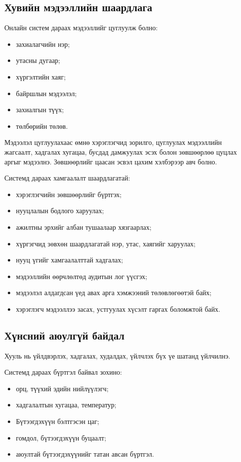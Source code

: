 \subsection{Хувийн мэдээллийн шаардлага}
Онлайн систем дараах мэдээллийг цуглуулж болно:
\begin{itemize}
    \item захиалагчийн нэр;
    \item утасны дугаар;
    \item хүргэлтийн хаяг;
    \item байршлын мэдээлэл;
    \item захиалгын түүх;
    \item төлбөрийн төлөв.
\end{itemize}

Мэдээлэл цуглуулахаас өмнө хэрэглэгчид зорилго, цуглуулах мэдээллийн жагсаалт, хадгалах хугацаа, бусдад дамжуулах эсэх болон зөвшөөрлөө цуцлах аргыг мэдээлнэ. Зөвшөөрлийг цаасан эсвэл цахим хэлбэрээр авч болно.

Системд дараах хамгаалалт шаардлагатай:
\begin{itemize}
    \item хэрэглэгчийн зөвшөөрлийг бүртгэх;
    \item нууцлалын бодлого харуулах;
    \item ажилтны эрхийг албан тушаалаар хязгаарлах;
    \item хүргэгчид зөвхөн шаардлагатай нэр, утас, хаягийг харуулах;
    \item нууц үгийг хамгаалалттай хадгалах;
    \item мэдээллийн өөрчлөлтөд аудитын лог үүсгэх;
    \item мэдээлэл алдагдсан үед авах арга хэмжээний төлөвлөгөөтэй байх;
    \item хэрэглэгч мэдээллээ засах, устгуулах хүсэлт гаргах боломжтой байх.
\end{itemize}

\subsection{Хүнсний аюулгүй байдал}

Хууль нь үйлдвэрлэх, хадгалах, худалдах, үйлчлэх бүх үе шатанд үйлчилнэ.

Системд дараах бүртгэл байвал зохино:
\begin{itemize}
    \item орц, түүхий эдийн нийлүүлэгч;
    \item хадгалалтын хугацаа, температур;
    \item Бүтээгдэхүүн бэлтгэсэн цаг;
    \item гомдол, бүтээгдэхүүн буцаалт;
    \item аюултай бүтээгдэхүүнийг татан авсан бүртгэл.
\end{itemize}

